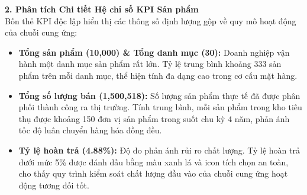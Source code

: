 \textbf{2. Phân tích Chi tiết Hệ chỉ số KPI Sản phẩm} \\
Bốn thẻ KPI độc lập hiển thị các thông số định lượng gộp về quy mô hoạt động của chuỗi cung ứng:
\begin{itemize}
    \item \textbf{Tổng sản phẩm (10,000) \& Tổng danh mục (30):} 
    Doanh nghiệp vận hành một danh mục sản phẩm rất lớn. Tỷ lệ trung bình khoảng 333 sản phẩm trên mỗi danh mục, thể hiện tính đa dạng cao trong cơ cấu mặt hàng.
    \item \textbf{Tổng số lượng bán (1,500,518):} 
    Số lượng sản phẩm thực tế đã được phân phối thành công ra thị trường. Tính trung bình, mỗi sản phẩm trong kho tiêu thụ được khoảng 150 đơn vị sản phẩm trong suốt chu kỳ 4 năm, phản ánh tốc độ luân chuyển hàng hóa đồng đều.
    \item \textbf{Tỷ lệ hoàn trả (4.88\%):} 
    Độ đo phản ánh rủi ro chất lượng. Tỷ lệ hoàn trả dưới mức 5\% được đánh dấu bằng màu xanh lá và icon tích chọn an toàn, cho thấy quy trình kiểm soát chất lượng đầu vào của chuỗi cung ứng hoạt động tương đối tốt.
\end{itemize}

